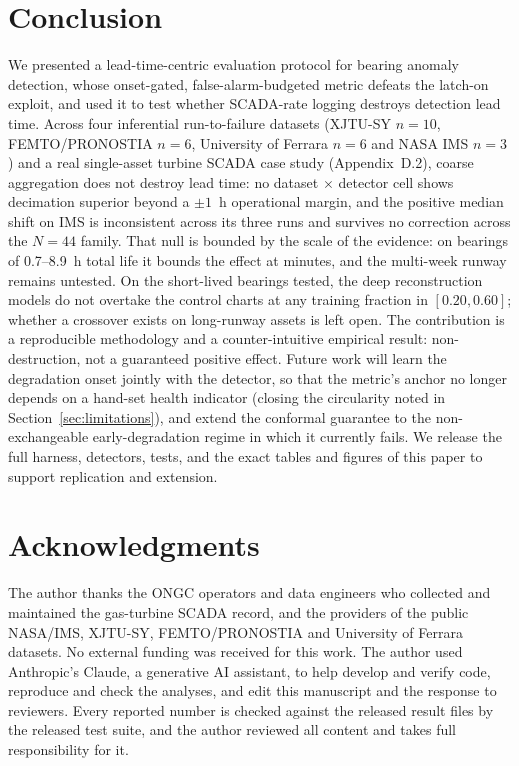 \documentclass[IJPHM, 2026, 0]{PHMSociety}
\makeatletter
\def\PHMslashbreak{\kern\z@\discretionary{}{}{}}
\makeatother
\begin{document}
\section{Conclusion}
We presented a lead-time-centric evaluation protocol for bearing anomaly detection, whose onset-gated, false-alarm-budgeted metric defeats the latch-on exploit, and used it to test whether SCADA-rate logging destroys detection lead time. Across four inferential run-to-failure datasets (XJTU-SY $n=10$, FEMTO/\PHMslashbreak PRONOSTIA $n=6$, University of Ferrara $n=6$ and NASA IMS $n=3$) and a real single-asset turbine SCADA case study (Appendix~D.2), coarse aggregation does not destroy lead time: no dataset $\times$ detector cell shows decimation superior beyond a $\pm 1$~h operational margin, and the positive median shift on IMS is inconsistent across its three runs and survives no correction across the $N=44$ family. That null is bounded by the scale of the evidence: on bearings of 0.7--8.9~h total life it bounds the effect at minutes, and the multi-week runway remains untested. On the short-lived bearings tested, the deep reconstruction models do not overtake the control charts at any training fraction in $[0.20, 0.60]$; whether a crossover exists on long-runway assets is left open. The contribution is a reproducible methodology and a counter-intuitive empirical result: non-destruction, not a guaranteed positive effect. Future work will learn the degradation onset jointly with the detector, so that the metric's anchor no longer depends on a hand-set health indicator (closing the circularity noted in Section~\ref{sec:limitations}), and extend the conformal guarantee to the non-exchangeable early-degradation regime in which it currently fails. We release the full harness, detectors, tests, and the exact tables and figures of this paper to support replication and extension.

\section*{Acknowledgments}
The author thanks the ONGC operators and data engineers who collected and maintained the gas-turbine SCADA record, and the providers of the public NASA/IMS, XJTU-SY, FEMTO/\PHMslashbreak PRONOSTIA and University of Ferrara datasets. No external funding was received for this work. The author used Anthropic's Claude, a generative AI assistant, to help develop and verify code, reproduce and check the analyses, and edit this manuscript and the response to reviewers. Every reported number is checked against the released result files by the released test suite, and the author reviewed all content and takes full responsibility for it.
\end{document}
